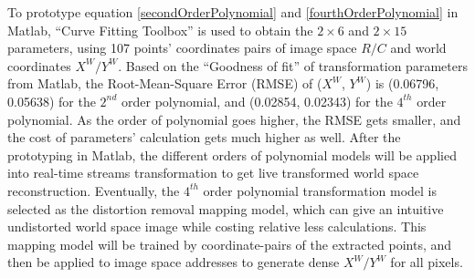 %
\indent
To prototype equation \ref{secondOrderPolynomial} and \ref{fourthOrderPolynomial} in Matlab, \enquote{Curve Fitting Toolbox} is used to obtain the $2\times6$ and $2\times15$ parameters, using 107 points' coordinates pairs of image space \(R/C\) and world coordinates \(X^W/Y^W\). Based on the \enquote{Goodness of fit} of transformation parameters from Matlab, the Root-Mean-Square Error (RMSE) of (\(X^W\), \(Y^W\)) is (0.06796, 0.05638) for the \(2^{nd}\) order polynomial, and (0.02854, 0.02343) for the \(4^{th}\) order polynomial. As the order of polynomial goes higher, the RMSE gets smaller, and the cost of parameters' calculation gets much higher as well. After the prototyping in Matlab, the different orders of polynomial models will be applied into real-time streams transformation to get live transformed world space reconstruction. Eventually, the \(4^{th}\) order polynomial transformation model is selected as the distortion removal mapping model, which can give an intuitive undistorted world space image while costing relative less calculations. This mapping model will be trained by coordinate-pairs of the extracted points, and then be applied to image space addresses to generate dense \(X^W/Y^W\) for all pixels.
%
%

